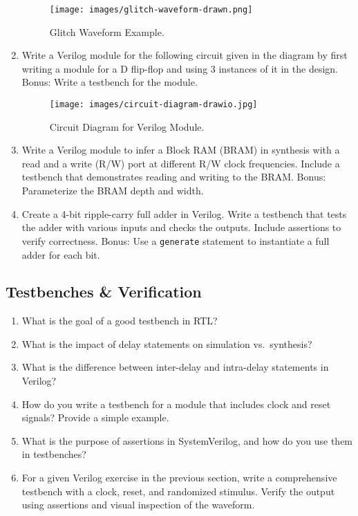 \documentclass[11pt]{article}
\begin{document}
\begin{enumerate}
    \begin{figure}[H]
        \centering
        \texttt{[image: images/glitch-waveform-drawn.png]}
        \caption{Glitch Waveform Example.}
        \label{fig:glitch_waveform}
    \end{figure}

    \item Write a Verilog module for the following circuit given in the diagram
    by first writing a module for a D flip-flop and using 3 instances of it in
    the design. Bonus: Write a testbench for the module.
    \begin{figure}[H]
        \centering
        \texttt{[image: images/circuit-diagram-drawio.jpg]}
        \caption{Circuit Diagram for Verilog Module.}
        \label{fig:verilog_circuit}
    \end{figure}

    \item Write a Verilog module to infer a Block RAM (BRAM) in synthesis with
    a read and a write (R/W) port at different R/W clock frequencies. Include a
    testbench that demonstrates reading and writing to the BRAM. Bonus:
    Parameterize the BRAM depth and width.

    \item Create a 4-bit ripple-carry full adder in Verilog. Write a testbench that
    tests the adder with various inputs and checks the outputs. Include
    assertions to verify correctness. Bonus: Use a \texttt{generate} statement to
    instantiate a full adder for each bit.
\end{enumerate}

\subsection{Testbenches \& Verification}
\begin{enumerate}
    \item What is the goal of a good testbench in RTL?
    \item What is the impact of delay statements on simulation vs.\ synthesis?
    \item What is the difference between inter-delay and intra-delay statements
    in Verilog?
    \item How do you write a testbench for a module that includes clock and
    reset signals? Provide a simple example.
    \item What is the purpose of assertions in SystemVerilog, and how do you
    use them in testbenches?
    \item For a given Verilog exercise in the previous section, write a
    comprehensive testbench with a clock, reset, and randomized stimulus.
    Verify the output using assertions and visual inspection of the waveform.
\end{enumerate}
\end{document}
